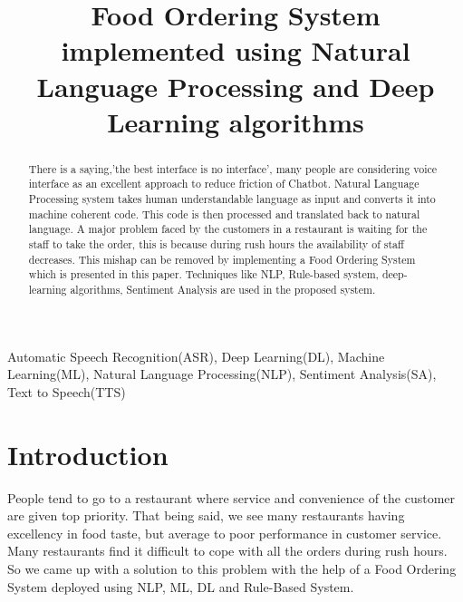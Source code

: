 \documentclass[conference]{IEEEtran}
\begin{document}
	\title{Food Ordering System implemented using Natural Language Processing and Deep Learning algorithms}
	\author{
		\and
		\and
	}
	\maketitle
	
	
	\begin{abstract}
		There is a saying,'the best interface is no interface', many people are considering voice interface as an excellent approach to reduce friction of Chatbot. Natural Language Processing system takes human understandable language as input and converts it into machine coherent code. This code is then processed and translated back to natural language. A major problem faced by the customers in a restaurant is waiting for the staff to take the order, this is because during rush hours the availability of staff decreases. This mishap can be removed by implementing a Food Ordering System which is presented in this paper. Techniques like NLP, Rule-based system, deep-learning algorithms, Sentiment Analysis are used in the proposed system.\\
	\end{abstract}
	\begin{IEEEkeywords}
		Automatic Speech Recognition(ASR), Deep Learning(DL), Machine Learning(ML), Natural Language Processing(NLP), Sentiment Analysis(SA), Text to Speech(TTS)
	\end{IEEEkeywords}
	\section{Introduction}
	People tend to go to a restaurant where service and convenience of the customer are given top priority. That being said, we see many restaurants having excellency in food taste, but average to poor performance in customer service. Many restaurants find it difficult to cope with all the orders during rush hours. So we came up with a solution to this problem with the help of a Food Ordering System deployed using NLP, ML, DL and Rule-Based System.
	
\end{document}
